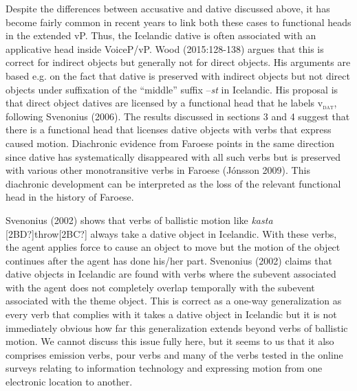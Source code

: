 \documentclass[12pt]{article}
\newcommand\textsubscript[1]{\ensuremath{{}_{\text{#1}}}}
\newenvironment{styleStandard}{\setlength\leftskip{0cm}\setlength\rightskip{0cm plus 1fil}\setlength\parindent{0cm}\setlength\parfillskip{0pt plus 1fil}\setlength\parskip{0in plus 1pt}\writerlistparindent\writerlistleftskip\leavevmode\normalfont\normalsize\writerlistlabel\ignorespaces}{\unskip\vspace{0.111in plus 0.0111in}\par}
\newcommand\writerlistleftskip{}
\newcommand\writerlistparindent{}
\newcommand\writerlistlabel{}
\begin{document}
\begin{styleStandard}
Despite the differences between accusative and dative discussed above, it has become fairly common in recent years to link both these cases to functional heads in the extended vP. Thus, the Icelandic dative is often associated with an applicative head inside VoiceP/vP. Wood (2015:128-138) argues that this is correct for indirect objects but generally not for direct objects. His arguments are based e.g. on the fact that dative is preserved with indirect objects but not direct objects under suffixation of the “middle” suffix –\textit{st} in Icelandic. His proposal is that direct object datives are licensed by a functional head that he labels v\textsc{\textsubscript{dat}}, following Svenonius (2006). The results discussed in sections 3 and 4 suggest that there is a functional head that licenses dative objects with verbs that express caused motion. Diachronic evidence from Faroese points in the same direction since dative has systematically disappeared with all such verbs but is preserved with various other monotransitive verbs in Faroese (Jónsson 2009). This diachronic development can be interpreted as the loss of the relevant functional head in the history of Faroese.
\end{styleStandard}

\begin{styleStandard}
Svenonius (2002) shows that verbs of ballistic motion like \textit{kasta} [2BD?]throw[2BC?] always take a dative object in Icelandic. With these verbs, the agent applies force to cause an object to move but the motion of the object continues after the agent has done his/her part. Svenonius (2002) claims that dative objects in Icelandic are found with verbs where the subevent associated with the agent does not completely overlap temporally with the subevent associated with the theme object. This is correct as a one-way generalization as every verb that complies with it takes a dative object in Icelandic but it is not immediately obvious how far this generalization extends beyond verbs of ballistic motion. We cannot discuss this issue fully here, but it seems to us that it also comprises emission verbs, pour verbs and many of the verbs tested in the online surveys relating to information technology and expressing motion from one electronic location to another. 
\end{styleStandard}
\end{document}
